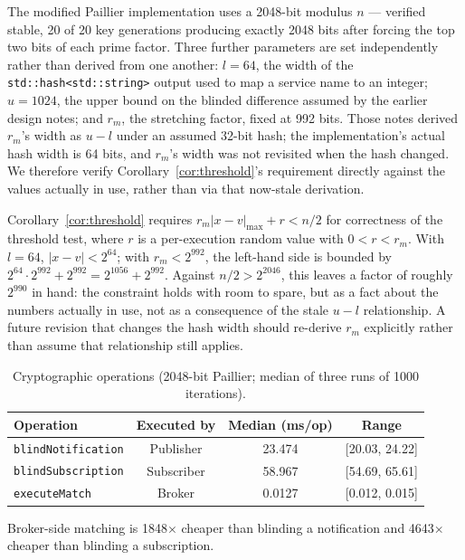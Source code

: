 \documentclass[10pt]{article}
\begin{document}
The modified Paillier implementation uses a 2048-bit modulus $n$ --- verified stable, 20 of 20 key generations producing exactly 2048 bits after forcing the top two bits of each prime factor. Three further parameters are set independently rather than derived from one another: $l = 64$, the width of the \texttt{std::hash<std::string>} output used to map a service name to an integer; $u = 1024$, the upper bound on the blinded difference assumed by the earlier design notes; and $r_m$, the stretching factor, fixed at 992 bits. Those notes derived $r_m$'s width as $u - l$ under an assumed 32-bit hash; the implementation's actual hash width is 64 bits, and $r_m$'s width was not revisited when the hash changed. We therefore verify Corollary~\ref{cor:threshold}'s requirement directly against the values actually in use, rather than via that now-stale derivation.

Corollary~\ref{cor:threshold} requires $r_m|x-v|_{\max} + r < n/2$ for correctness of the threshold test, where $r$ is a per-execution random value with $0 < r < r_m$. With $l = 64$, $|x-v| < 2^{64}$; with $r_m < 2^{992}$, the left-hand side is bounded by $2^{64} \cdot 2^{992} + 2^{992} = 2^{1056} + 2^{992}$. Against $n/2 > 2^{2046}$, this leaves a factor of roughly $2^{990}$ in hand: the constraint holds with room to spare, but as a fact about the numbers actually in use, not as a consequence of the stale $u - l$ relationship. A future revision that changes the hash width should re-derive $r_m$ explicitly rather than assume that relationship still applies.

\begin{table}[H]
\centering
\caption{Cryptographic operations (2048-bit Paillier; median of three runs of 1000 iterations).}
\label{tab:microbench}
\begin{tabular}{lccc}
\toprule
Operation & Executed by & Median (ms/op) & Range \\
\midrule
\texttt{blindNotification} & Publisher  & 23.474 & [20.03, 24.22] \\
\texttt{blindSubscription} & Subscriber & 58.967 & [54.69, 65.61] \\
\texttt{executeMatch}      & Broker     & 0.0127 & [0.012, 0.015] \\
\bottomrule
\end{tabular}
\end{table}

Broker-side matching is 1848$\times$ cheaper than blinding a notification and 4643$\times$ cheaper than blinding a subscription.
\end{document}
